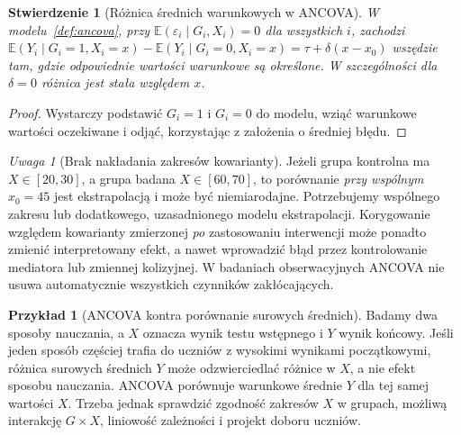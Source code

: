 \documentclass[11pt,a4paper,oneside]{report}
\numberwithin{equation}{chapter}
\theoremstyle{plain}
\newtheorem{stwierdzenie}[twierdzenie]{Stwierdzenie}
\theoremstyle{definition}
\newtheorem{przyklad}{Przykład}[chapter]
\theoremstyle{remark}
\newtheorem{uwaga}{Uwaga}[chapter]
\newcommand{\E}{\mathbb E}
\begin{document}
\begin{stwierdzenie}[Różnica średnich warunkowych w ANCOVA]\label{prop:ancova-contrast}
W modelu~\ref{def:ancova}, przy $\E(\varepsilon_i\mid G_i,X_i)=0$ dla wszystkich $i$, zachodzi
$\E(Y_i\mid G_i=1,X_i=x)-\E(Y_i\mid G_i=0,X_i=x)=\tau+\delta(x-x_0)$
wszędzie tam, gdzie odpowiednie wartości warunkowe są określone. W szczególności dla $\delta=0$ różnica jest stała względem $x$.
\end{stwierdzenie}
\begin{proof}
Wystarczy podstawić $G_i=1$ i $G_i=0$ do modelu, wziąć warunkowe wartości oczekiwane i odjąć, korzystając z założenia o średniej błędu.
\end{proof}

\begin{uwaga}[Brak nakładania zakresów kowarianty]
Jeżeli grupa kontrolna ma $X\in[20,30]$, a grupa badana $X\in[60,70]$, to porównanie \emph{przy wspólnym} $x_0=45$ jest ekstrapolacją i może być niemiarodajne. Potrzebujemy wspólnego zakresu lub dodatkowego, uzasadnionego modelu ekstrapolacji. Korygowanie względem kowarianty zmierzonej \emph{po} zastosowaniu interwencji może ponadto zmienić interpretowany efekt, a nawet wprowadzić błąd przez kontrolowanie mediatora lub zmiennej kolizyjnej. W badaniach obserwacyjnych ANCOVA nie usuwa automatycznie wszystkich czynników zakłócających.
\end{uwaga}

\begin{przyklad}[ANCOVA kontra porównanie surowych średnich]
Badamy dwa sposoby nauczania, a $X$ oznacza wynik testu wstępnego i $Y$ wynik końcowy. Jeśli jeden sposób częściej trafia do uczniów z wysokimi wynikami początkowymi, różnica surowych średnich $Y$ może odzwierciedlać różnice w $X$, a nie efekt sposobu nauczania. ANCOVA porównuje warunkowe średnie $Y$ dla tej samej wartości $X$. Trzeba jednak sprawdzić zgodność zakresów $X$ w grupach, możliwą interakcję $G\times X$, liniowość zależności i projekt doboru uczniów.
\end{przyklad}
\end{document}
